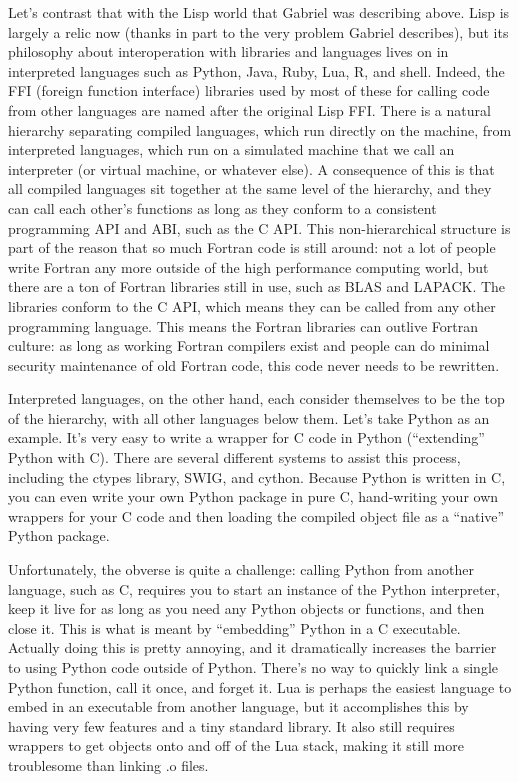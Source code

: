 \documentclass[12pt]{article}
\begin{document}
Let's contrast that with the Lisp world that Gabriel was describing above.
Lisp is largely a relic now (thanks in part to the very problem Gabriel
describes), but its philosophy about interoperation with libraries and
languages lives on in interpreted languages such as Python, Java, Ruby, Lua, R,
and shell. Indeed, the FFI (foreign function interface) libraries used by most
of these for calling code from other languages are named after the original
Lisp FFI. There is a natural hierarchy separating compiled languages, which run
directly on the machine, from interpreted languages, which run on a simulated
machine that we call an interpreter (or virtual machine, or whatever else). A
consequence of this is that all compiled languages sit together at the same
level of the hierarchy, and they can call each other's functions as long as
they conform to a consistent programming API and ABI, such as the C API.  This
non-hierarchical structure is part of the reason that so much Fortran code is
still around: not a lot of people write Fortran any more outside of the high
performance computing world, but there are a ton of Fortran libraries still in
use, such as BLAS and LAPACK. The libraries conform to the C API, which means
they can be called from any other programming language. This means the Fortran
libraries can outlive Fortran culture: as long as working Fortran compilers
exist and people can do minimal security maintenance of old Fortran code, this
code never needs to be rewritten.

Interpreted languages, on the other hand, each consider themselves to be the
top of the hierarchy, with all other languages below them. Let's take Python as
an example.  It's very easy to write a wrapper for C code in Python
(``extending'' Python with C). There are several different systems to assist
this process, including the ctypes library, SWIG, and cython. Because Python is
written in C, you can even write your own Python package in pure C,
hand-writing your own wrappers for your C code and then loading the compiled
object file as a ``native'' Python package.

Unfortunately, the obverse is quite a challenge: calling Python from another
language, such as C, requires you to start an instance of the Python
interpreter, keep it live for as long as you need any Python objects or
functions, and then close it. This is what is meant by ``embedding'' Python in
a C executable. Actually doing this is pretty annoying, and it dramatically
increases the barrier to using Python code outside of Python.  There's no way
to quickly link a single Python function, call it once, and forget it. Lua is
perhaps the easiest language to embed in an executable from another language,
but it accomplishes this by having very few features and a tiny standard
library. It also still requires wrappers to get objects onto and off of the Lua
stack, making it still more troublesome than linking .o files.
\end{document}
